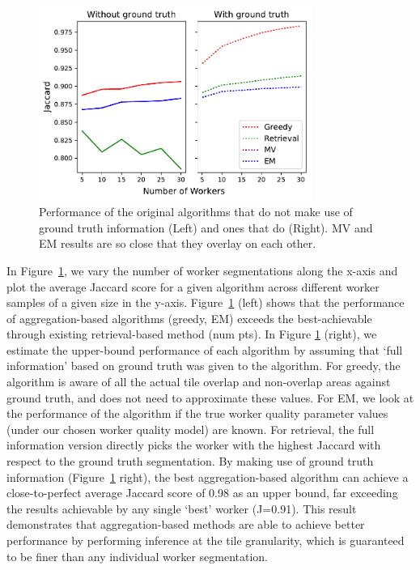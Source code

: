 \begin{figure}[h!]
   \centering
   \includegraphics[trim={0 5pt 4pt 0},clip,width=0.8\textwidth]{plots/Retrieval_vs_Aggregation.pdf}
   \vspace{-4pt}
   \caption{Performance of the original algorithms that do not make use of ground truth information (Left) and ones that do (Right). MV and EM results are so close that they overlay on each other.} %
   \label{retrieval_vs_aggregation}   
   \vspace{-10pt}
   \setlength{\abovecaptionskip}{-30pt}
   \setlength{\belowcaptionskip}{-23pt}
\end{figure} 
\npar In Figure~\ref{retrieval_vs_aggregation}, we vary the number of worker segmentations along the x-axis and plot the average Jaccard score for a given algorithm across different worker samples of a given size in the y-axis. Figure~\ref{retrieval_vs_aggregation} (left) shows that the performance of aggregation-based algorithms (greedy, EM) exceeds the best-achievable through existing retrieval-based method (num pts). In Figure \ref{retrieval_vs_aggregation} (right), we estimate the upper-bound performance of each algorithm by assuming that `full information' based on ground truth was given to the algorithm. For greedy, the algorithm is aware of all the actual tile overlap and non-overlap areas against ground truth, and does not need to approximate these values. For EM, we look at the performance of the algorithm if the true worker quality parameter values (under our chosen worker quality model) are known. For retrieval, the full information version directly picks the worker with the highest Jaccard with respect to the ground truth segmentation. By making use of ground truth information (Figure~\ref{retrieval_vs_aggregation} right), the best aggregation-based algorithm can achieve a close-to-perfect average Jaccard score of 0.98 as an upper bound, far exceeding the results achievable by any single `best' worker (J=0.91). This result demonstrates that aggregation-based methods are able to achieve better performance by performing inference at the tile granularity, which is guaranteed to be finer than any individual worker segmentation. 


